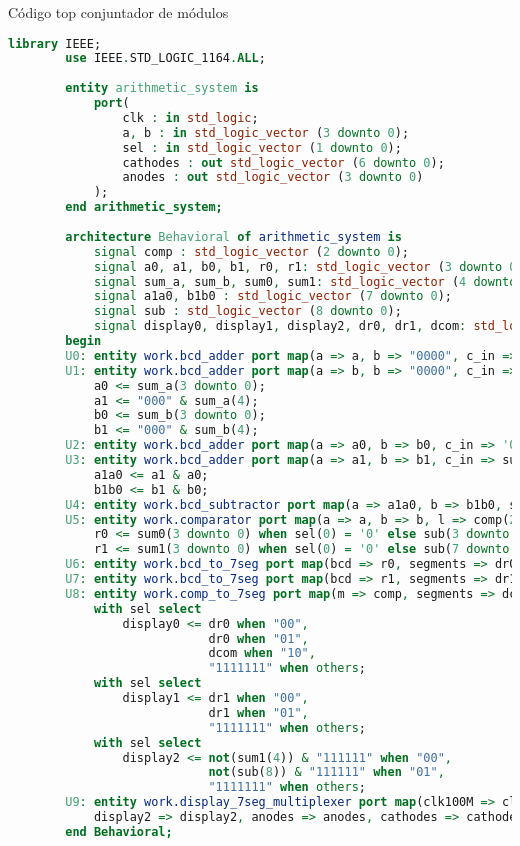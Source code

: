 \documentclass[a4paper, 12pt]{article}
\begin{document}
    Código top conjuntador de módulos
    \begin{lstlisting}[language=VHDL]
        library IEEE;
        use IEEE.STD_LOGIC_1164.ALL;
        
        entity arithmetic_system is
            port(
                clk : in std_logic;
                a, b : in std_logic_vector (3 downto 0);
                sel : in std_logic_vector (1 downto 0);
                cathodes : out std_logic_vector (6 downto 0);
                anodes : out std_logic_vector (3 downto 0)
            );
        end arithmetic_system;
        
        architecture Behavioral of arithmetic_system is
            signal comp : std_logic_vector (2 downto 0);
            signal a0, a1, b0, b1, r0, r1: std_logic_vector (3 downto 0);
            signal sum_a, sum_b, sum0, sum1: std_logic_vector (4 downto 0);
            signal a1a0, b1b0 : std_logic_vector (7 downto 0);
            signal sub : std_logic_vector (8 downto 0);
            signal display0, display1, display2, dr0, dr1, dcom: std_logic_vector (6 downto 0);
        begin
        U0: entity work.bcd_adder port map(a => a, b => "0000", c_in => '0', s => sum_a);
        U1: entity work.bcd_adder port map(a => b, b => "0000", c_in => '0', s => sum_b);
            a0 <= sum_a(3 downto 0);
            a1 <= "000" & sum_a(4);
            b0 <= sum_b(3 downto 0);
            b1 <= "000" & sum_b(4);
        U2: entity work.bcd_adder port map(a => a0, b => b0, c_in => '0', s => sum0);
        U3: entity work.bcd_adder port map(a => a1, b => b1, c_in => sum0(4), s => sum1);
            a1a0 <= a1 & a0;
            b1b0 <= b1 & b0;
        U4: entity work.bcd_subtractor port map(a => a1a0, b => b1b0, s => sub);
        U5: entity work.comparator port map(a => a, b => b, l => comp(2), e => comp(1), g => comp(0));
            r0 <= sum0(3 downto 0) when sel(0) = '0' else sub(3 downto 0);
            r1 <= sum1(3 downto 0) when sel(0) = '0' else sub(7 downto 4);
        U6: entity work.bcd_to_7seg port map(bcd => r0, segments => dr0);
        U7: entity work.bcd_to_7seg port map(bcd => r1, segments => dr1);
        U8: entity work.comp_to_7seg port map(m => comp, segments => dcom);
            with sel select
                display0 <= dr0 when "00",
                            dr0 when "01",
                            dcom when "10",
                            "1111111" when others;
            with sel select
                display1 <= dr1 when "00",
                            dr1 when "01",
                            "1111111" when others;
            with sel select
                display2 <= not(sum1(4)) & "111111" when "00",
                            not(sub(8)) & "111111" when "01",
                            "1111111" when others;
        U9: entity work.display_7seg_multiplexer port map(clk100M => clk, display0 => display0, display1 => display1,
            display2 => display2, anodes => anodes, cathodes => cathodes);
        end Behavioral;
    \end{lstlisting}
\end{document}
